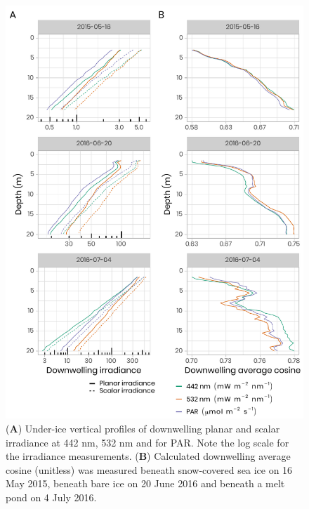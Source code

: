 \documentclass[12pt,a4paper]{scrartcl}
\begin{document}
\clearpage
\newpage

\begin{figure}[h]
	\centering
	\includegraphics[scale = 1]{../../../graphs/fig06.pdf}
	\caption{(\textbf{A}) Under-ice vertical profiles of downwelling planar and scalar irradiance at 442 nm, 532 nm and for PAR. Note the log scale for the irradiance measurements. (\textbf{B}) Calculated downwelling average cosine (unitless) was measured beneath snow-covered sea ice on 16 May 2015, beneath bare ice on 20 June 2016 and beneath a melt pond on 4 July 2016.}
\end{figure}

\clearpage
\newpage
\end{document}
